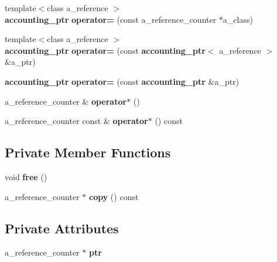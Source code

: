 \begin{DoxyCompactItemize}
\item 
{\footnotesize template$<$class a\_\-reference $>$ }\\{\bf accounting\_\-ptr} {\bfseries operator=} (const a\_\-reference\_\-counter $\ast$a\_\-class)\label{classaccounting__ptr_a5dd8f5ef49ec13c39e69ad1e8f041993}

\item 
{\footnotesize template$<$class a\_\-reference $>$ }\\{\bf accounting\_\-ptr} {\bfseries operator=} (const {\bf accounting\_\-ptr}$<$ a\_\-reference $>$ \&a\_\-ptr)\label{classaccounting__ptr_a81364b6b48d017f06acdf97f28460d91}

\item 
{\bf accounting\_\-ptr} {\bfseries operator=} (const {\bf accounting\_\-ptr} \&a\_\-ptr)\label{classaccounting__ptr_a6adc37a7b370d74b681dc50b39cc1312}

\item 
a\_\-reference\_\-counter \& {\bfseries operator$\ast$} ()\label{classaccounting__ptr_aa8f3ff834d038b0daae9cfc3dc5b4440}

\item 
a\_\-reference\_\-counter const \& {\bfseries operator$\ast$} () const \label{classaccounting__ptr_a23744e5e25f9e40287f4171649a8d7b4}

\end{DoxyCompactItemize}
\subsection*{Private Member Functions}
\begin{DoxyCompactItemize}
\item 
void {\bfseries free} ()\label{classaccounting__ptr_a80bc13a40d700a393957440b323f85cf}

\item 
a\_\-reference\_\-counter $\ast$ {\bfseries copy} () const \label{classaccounting__ptr_a52236e3c2c6495ed4cef87ab94c5b71a}

\end{DoxyCompactItemize}
\subsection*{Private Attributes}
\begin{DoxyCompactItemize}
\item 
a\_\-reference\_\-counter $\ast$ {\bfseries ptr}\label{classaccounting__ptr_a5ea56688db6727a075933b2e1c41e05b}

\end{DoxyCompactItemize}
